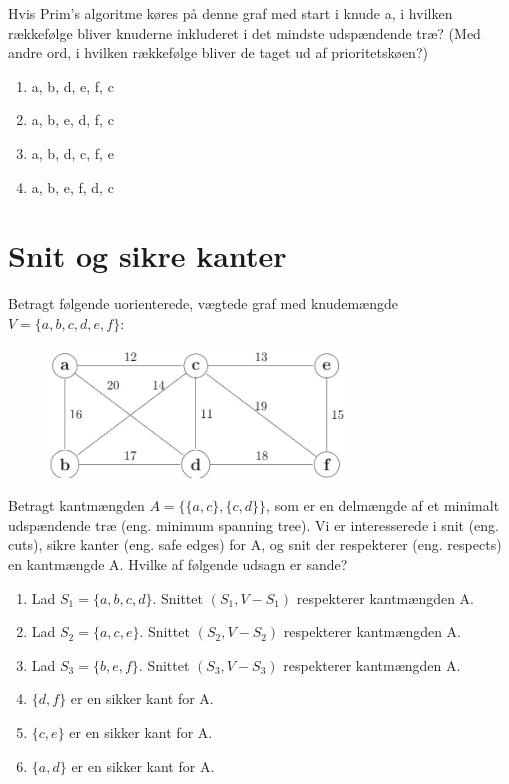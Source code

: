 \documentclass[12pt,a4paper]{article}
\begin{document}
Hvis Prim's algoritme køres på denne graf med start i knude a, i hvilken rækkefølge bliver knuderne inkluderet i det mindste udspændende træ? (Med andre ord, i hvilken rækkefølge bliver de taget ud af prioritetskøen?)

\begin{enumerate}
    \item a, b, d, e, f, c
    \item a, b, e, d, f, c
    \item a, b, d, c, f, e
    \item a, b, e, f, d, c
\end{enumerate}

\section{Snit og sikre kanter}

Betragt følgende uorienterede, vægtede graf med knudemængde $V = \{a, b, c, d, e, f\}$:

\begin{figure}[h]
    \centering
    \includegraphics[width=0.7\textwidth]{Ugeopgave_5_markdown/Ugeopgave_5/_page_1_Figure_12.jpeg}
\end{figure}

Betragt kantmængden $A = \{\{a, c\}, \{c, d\}\}$, som er en delmængde af et minimalt udspændende træ (eng. minimum spanning tree). Vi er interesserede i snit (eng. cuts), sikre kanter (eng. safe edges) for A, og snit der respekterer (eng. respects) en kantmængde A. Hvilke af følgende udsagn er sande?

\begin{enumerate}
    \item Lad $S_1 = \{a, b, c, d\}$. Snittet $(S_1, V - S_1)$ respekterer kantmængden A.
    \item Lad $S_2 = \{a, c, e\}$. Snittet $(S_2, V - S_2)$ respekterer kantmængden A.
    \item Lad $S_3 = \{b, e, f\}$. Snittet $(S_3, V - S_3)$ respekterer kantmængden A.
    \item $\{d, f\}$ er en sikker kant for A.
    \item $\{c, e\}$ er en sikker kant for A.
    \item $\{a, d\}$ er en sikker kant for A.
\end{enumerate}
\end{document}
